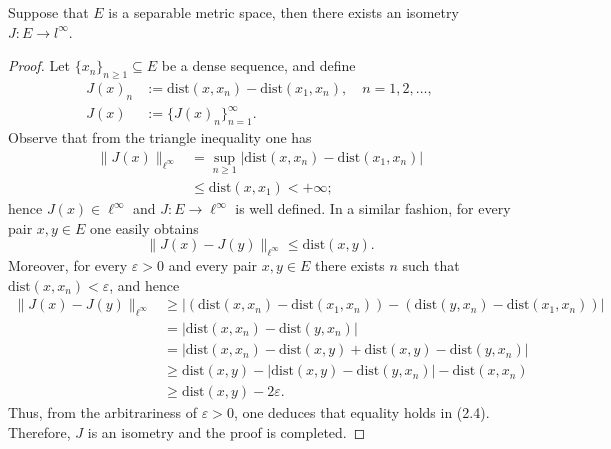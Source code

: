 \documentclass[12pt]{article}
\begin{document}
{\begin{theorem}
    Suppose that $E$ is a separable metric space, then there exists an isometry $J : E \to l^\infty$.
\end{theorem}

\begin{proof}
    Let $\{x_n\}_{n \geqslant 1} \subseteq E$ be a dense sequence, and define
    \begin{align*}
        J(x)_n &:= \mathrm{dist}(x, x_n) - \mathrm{dist}(x_1, x_n), \quad n = 1, 2, \ldots, \\
        J(x) &:= \{J(x)_n\}_{n=1}^{\infty}.
    \end{align*}
    Observe that from the triangle inequality one has
    \begin{align*}
        \|J(x)\|_{\ell^\infty} &= \sup_{n \geqslant 1} \left| \mathrm{dist}(x, x_n) 
        - \mathrm{dist}(x_1, x_n) \right| \\
        &\leqslant \mathrm{dist}(x, x_1) < +\infty;
    \end{align*}
    hence $J(x) \in \ell^\infty$ and $J : E \to \ell^\infty$ is well defined. 
    In a similar fashion, for every pair $x, y \in E$ one easily obtains
    \begin{equation}
        \|J(x) - J(y)\|_{\ell^\infty} \leqslant \mathrm{dist}(x, y).
    \end{equation}
    Moreover, for every $\varepsilon > 0$ and every pair $x, y \in E$ there exists 
    $n$ such that $\mathrm{dist}(x, x_n) < \varepsilon$, and hence
    \begin{align*}
        \|J(x) - J(y)\|_{\ell^\infty} 
        &\geqslant \left| \left(\mathrm{dist}(x, x_n) - \mathrm{dist}(x_1, x_n)\right) 
        - \left(\mathrm{dist}(y, x_n) - \mathrm{dist}(x_1, x_n)\right) \right| \\
        &= \left| \mathrm{dist}(x, x_n) - \mathrm{dist}(y, x_n) \right| \\
        &= \left| \mathrm{dist}(x, x_n) - \mathrm{dist}(x, y) + \mathrm{dist}(x, y) 
        - \mathrm{dist}(y, x_n) \right| \\
        &\geqslant \mathrm{dist}(x, y) - \left| \mathrm{dist}(x, y) 
        - \mathrm{dist}(y, x_n) \right| - \mathrm{dist}(x, x_n) \\
        &\geqslant \mathrm{dist}(x, y) - 2\varepsilon.
    \end{align*}
    Thus, from the arbitrariness of $\varepsilon > 0$, one deduces that equality 
    holds in (2.4). Therefore, $J$ is an isometry and the proof is completed.
\end{proof}

}
\end{document}
